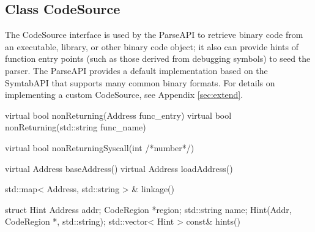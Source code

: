 \subsection{Class CodeSource}
\label{sec:codesource}


The CodeSource interface is used by the ParseAPI to retrieve binary code from
an executable, library, or other binary code object; it also can provide hints
of function entry points (such as those derived from debugging symbols) to seed
the parser. The ParseAPI provides a default implementation based on the
SymtabAPI that supports many common binary formats. For details on implementing
a custom CodeSource, see Appendix \ref{sec:extend}.

\begin{apient}
virtual bool nonReturning(Address func_entry)
virtual bool nonReturning(std::string func_name)
\end{apient}

\begin{apient}
virtual bool nonReturningSyscall(int /*number*/)
\end{apient}


\begin{apient}
virtual Address baseAddress()
virtual Address loadAddress()
\end{apient}

\begin{apient}
std::map< Address, std::string > & linkage()
\end{apient}

\begin{apient}
struct Hint {
    Address addr;
    CodeRegion *region;
    std::string name;
    Hint(Addr, CodeRegion *, std::string);
}
std::vector< Hint > const& hints()
\end{apient}

